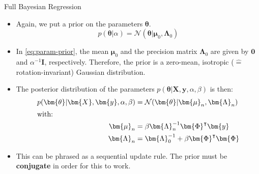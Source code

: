 \begin{dwHeaderFrame}{Full Bayesian Regression}
	\begin{itemize}
		\item Again, we put a prior on the parameters $\bm{\theta}$.
		\begin{equation}
			p(\bm{\theta} \vert \alpha) = \mathcal{N}(\bm{\theta} \vert \bm{\mu}_0, \bm{\Lambda}_0)
			\label{eq:param-prior}
		\end{equation}
		\item In \cref{eq:param-prior}, the mean $\bm{\mu}_0$ and the precision matrix $\bm{\Lambda}_0$ are given by $\bm{0}$ and $\alpha^{-1} \bm{I}$, respectively.
			Therefore, the prior is a zero-mean, isotropic ($\widehat{=}$ rotation-invariant) Gaussian distribution.
		\item The posterior distribution of the parameters $p(\bm{\theta} \vert \bm{X}, \bm{y}, \alpha, \beta)$ is then:
		\begin{align}
			p(\bm{\theta} \vert \bm{X}, \bm{y}, \alpha, \beta)
				&= \mathcal{N}(\bm{\theta} \vert \bm{\mu}_n, \bm{\Lambda}_n) \\
			\shortintertext{with:}
			\bm{\mu}_n
				&= \beta \bm{\Lambda}_n^{-1} \bm{\Phi}^{\intercal} \bm{y}\\
			\bm{\Lambda}_n
				&= \bm{\Lambda}_0^{-1} + \beta \bm{\Phi}^{\intercal} \bm{\Phi}
		\end{align}
		\item This can be phrased as a sequential update rule. The prior must be \textbf{conjugate} in order for this to work.
	\end{itemize}
\end{dwHeaderFrame}


